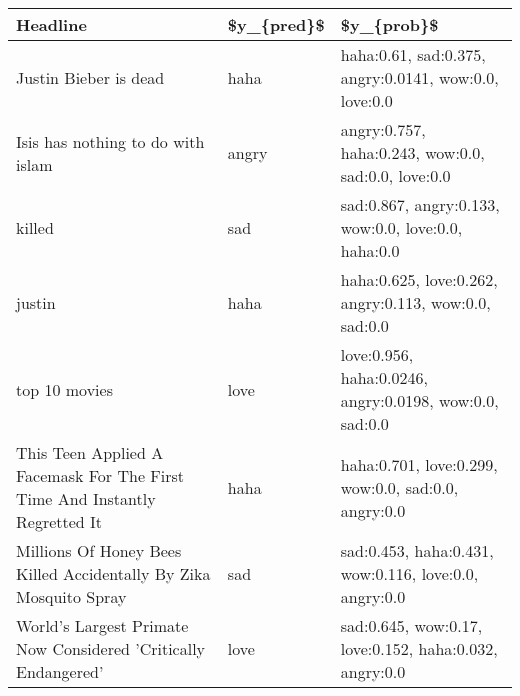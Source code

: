 \begin{tabular}{lll}
\toprule
                                                                   Headline & \$y\_\{pred\}\$ &                                               \$y\_\{prob\}\$ \\
\midrule
                                                      Justin Bieber is dead &       haha &    haha:0.61, sad:0.375, angry:0.0141, wow:0.0, love:0.0 \\
                                          Isis has nothing to do with islam &      angry &      angry:0.757, haha:0.243, wow:0.0, sad:0.0, love:0.0 \\
                                                                     killed &        sad &      sad:0.867, angry:0.133, wow:0.0, love:0.0, haha:0.0 \\
                                                                     justin &       haha &    haha:0.625, love:0.262, angry:0.113, wow:0.0, sad:0.0 \\
                                                              top 10 movies &       love &  love:0.956, haha:0.0246, angry:0.0198, wow:0.0, sad:0.0 \\
 This Teen Applied A Facemask For The First Time And Instantly Regretted It &       haha &      haha:0.701, love:0.299, wow:0.0, sad:0.0, angry:0.0 \\
          Millions Of Honey Bees Killed Accidentally By Zika Mosquito Spray &        sad &    sad:0.453, haha:0.431, wow:0.116, love:0.0, angry:0.0 \\
             World's Largest Primate Now Considered 'Critically Endangered' &       love &   sad:0.645, wow:0.17, love:0.152, haha:0.032, angry:0.0 \\
\bottomrule
\end{tabular}
